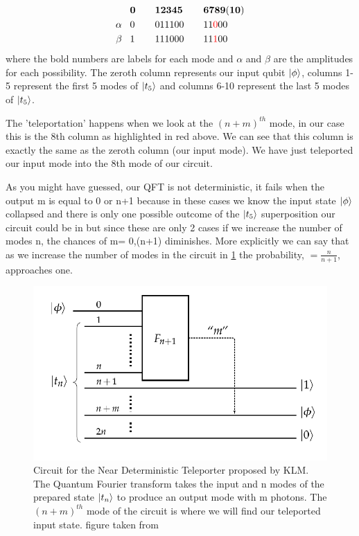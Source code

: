  \begin{alignat*}{0}
        &\mathbf{0} \quad  &  &\mathbf{1 2 3 4 5}  \quad &  &\mathbf{6 7 8 9 (10)}\\
        \alpha \;\;\;  &0 \quad &  &0 1 1 1 0 0  \quad  &  &1 1 {\color{red}0} 0 0 \\
        \beta  \;\;\; &1 \quad  &  &1 1 1 0 0 0 \quad &  &1 1 {\color{red}1} 0 0 \\
\end{alignat*}
where the bold numbers are labels for each mode and $\alpha$ and $\beta$ are the amplitudes for each possibility. The zeroth column represents our input qubit $\ket{\phi}$, columns 1-5 represent the first 5 modes of $\ket{t_5}$ and columns 6-10 represent the last 5 modes of $\ket{t_5}$.
\par
The 'teleportation' happens when we look at the $(n+m)^{th}$ mode, in our case this is the 8th column as highlighted in red above.  We can see that this column is exactly the same as the zeroth column (our input mode). We have just teleported our input mode into the 8th mode of our circuit. 
\par
As you might have guessed, our QFT is not deterministic, it fails when the output m is equal to 0 or n+1 because in these cases we know the input state $\ket{\phi}$ collapsed and there is only one possible outcome of the $\ket{t_5}$ superposition our circuit could be in but since these are only 2 cases if we increase the number of modes n, the chances of m= 0,(n+1) diminishes. More explicitly we can say that as we increase the number of modes in the circuit in \cref{fig:Near deterministic tele} the probability, $= \frac{n}{n+1}$, approaches one.

\begin{figure}[H]
    \centering
    \includegraphics[scale=0.5]{images/Near Deterministic Teleporter.png}
    \caption{Circuit for the Near Deterministic Teleporter proposed by KLM. The Quantum Fourier transform takes the input and n modes of the prepared state $\ket{t_n}$ to produce an output mode with m photons. The $(n+m)^{th}$ mode of the circuit is where we will find our teleported input state. figure taken from \cite{Kok:2005jip}}
    \label{fig:Near deterministic tele}
\end{figure}

